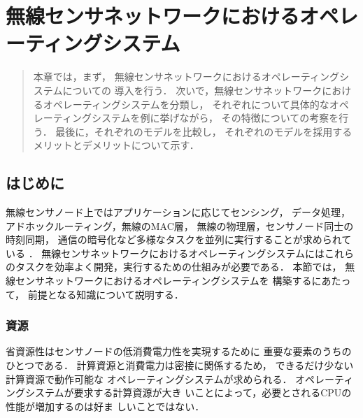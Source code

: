 \chapter{無線センサネットワークにおけるオペレーティングシステム}\label{chap:os_in_WSN}
\begin{large}
\begin{quote}
本章では，まず，
無線センサネットワークにおけるオペレーティングシステムについての
導入を行う．
次いで，無線センサネットワークにおけるオペレーティングシステムを分類し，
それぞれについて具体的なオペレーティングシステムを例に挙げながら，
その特徴についての考察を行う．
最後に，それぞれのモデルを比較し，
それぞれのモデルを採用するメリットとデメリットについて示す．
\end{quote}
\end{large}
\clearpage


\section{はじめに}
無線センサノード上ではアプリケーションに応じてセンシング，
データ処理，アドホックルーティング，無線のMAC層，
無線の物理層，センサノード同士の時刻同期，
通信の暗号化など多様なタスクを並列に実行することが求められている
\cite{10.1109/IISWC.2005.1526017}．
無線センサネットワークにおけるオペレーティングシステムにはこれら
のタスクを効率よく開発，実行するための仕組みが必要である．
本節では，
無線センサネットワークにおけるオペレーティングシステムを
構築するにあたって，
前提となる知識について説明する．

%
%



\subsection{資源}
省資源性はセンサノードの低消費電力性を実現するために
重要な要素のうちのひとつである．
計算資源と消費電力は密接に関係するため，
できるだけ少ない計算資源で動作可能な
オペレーティングシステムが求められる．
オペレーティングシステムが要求する計算資源が大き
いことによって，必要とされるCPUの性能が増加するのは好ま
しいことではない．



